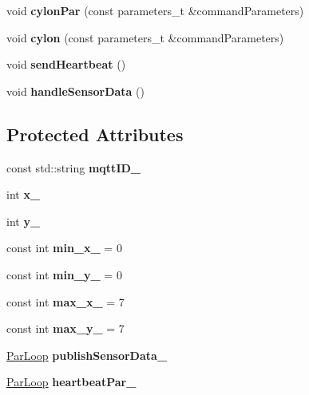 \begin{DoxyCompactItemize}
void {\bfseries cylon\+Par} (const parameters\+\_\+t \&command\+Parameters)
\item 
\mbox{\label{class_m_q_t_t_client_ab72ff65aad0f2284a330455ac7a005ff}} 
void {\bfseries cylon} (const parameters\+\_\+t \&command\+Parameters)
\item 
\mbox{\label{class_m_q_t_t_client_a55942a209770945923683779314753a6}} 
void {\bfseries send\+Heartbeat} ()
\item 
\mbox{\label{class_m_q_t_t_client_ab8938befea0aabd37b153e7e90364ec1}} 
void {\bfseries handle\+Sensor\+Data} ()
\end{DoxyCompactItemize}
\subsection*{Protected Attributes}
\begin{DoxyCompactItemize}
\item 
\mbox{\label{class_m_q_t_t_client_a193d573ede414e974ff855928c0b43fb}} 
const std\+::string {\bfseries mqtt\+I\+D\+\_\+}
\item 
\mbox{\label{class_m_q_t_t_client_a04e9a83d269ed21031ef2a1e0979fcec}} 
int {\bfseries x\+\_\+}
\item 
\mbox{\label{class_m_q_t_t_client_a409bea6f7434a1e2dd0e698229c24b5c}} 
int {\bfseries y\+\_\+}
\item 
\mbox{\label{class_m_q_t_t_client_a40a5697017f41c3ec1e54a8292db709e}} 
const int {\bfseries min\+\_\+x\+\_\+} = 0
\item 
\mbox{\label{class_m_q_t_t_client_a96c02513e6361435c64853702e0f66d3}} 
const int {\bfseries min\+\_\+y\+\_\+} = 0
\item 
\mbox{\label{class_m_q_t_t_client_a50acb61af1f263190c6071bfdb006275}} 
const int {\bfseries max\+\_\+x\+\_\+} = 7
\item 
\mbox{\label{class_m_q_t_t_client_aa314c9d80898799b0d00c3522ec394c8}} 
const int {\bfseries max\+\_\+y\+\_\+} = 7
\item 
\mbox{\label{class_m_q_t_t_client_a863a560da9caaee97ddcc1802fea5ce1}} 
\mbox{\hyperlink{class_par_loop}{Par\+Loop}} {\bfseries publish\+Sensor\+Data\+\_\+}
\item 
\mbox{\label{class_m_q_t_t_client_a03be3aebc7c89d6d47e5cf448b9bea26}} 
\mbox{\hyperlink{class_par_loop}{Par\+Loop}} {\bfseries heartbeat\+Par\+\_\+}
\end{DoxyCompactItemize}


